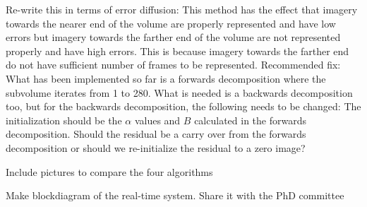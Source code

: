 \begin{compact_todolist}
\begin{compact_todolist}
    \item Re-write this in terms of error diffusion: This method has the effect that imagery towards the nearer end of the volume are properly represented and have low errors but imagery towards the farther end of the volume are not represented properly and have high errors. This is because imagery towards the farther end do not have sufficient number of frames to be represented. Recommended fix: What has been implemented so far is a forwards decomposition where the subvolume iterates from 1 to 280. What is needed is a backwards decomposition too, but for the backwards decomposition, the following needs to be changed: The initialization should be the $\alpha$ values and $B$ calculated in the forwards decomposition. Should the residual be a carry over from the forwards decomposition or should we re-initialize the residual to a zero image?
    \end{compact_todolist}
\item Include pictures to compare the four algorithms
\item Make blockdiagram of the real-time system. Share it with the PhD committee
\end{compact_todolist}